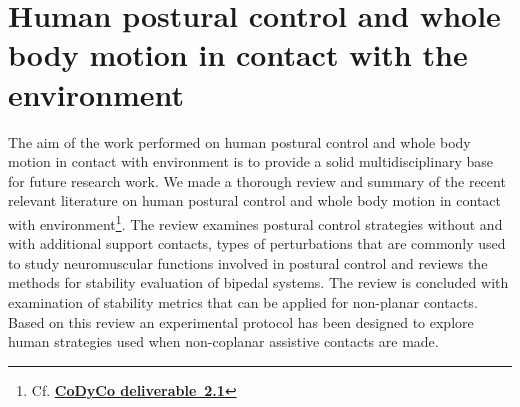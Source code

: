 \documentclass[final,5p,twocolumn]{elsarticle}
\begin{document}
\section{Human postural control and whole body motion in contact with the environment}
The aim of the work performed on human postural control and whole body motion in contact with environment is to provide a solid multidisciplinary base for future research work. We made a thorough review and summary of the recent relevant literature on human postural control and whole body motion in contact with environment\footnote{Cf. \href{https://github.com/robotology-playground/codyco-deliverables/blob/master/D2.1/pdf/D2.1.pdf?raw=true}{\textbf{CoDyCo deliverable~2.1}}}. The review examines postural control strategies without and with additional support contacts, types of perturbations that are commonly used to study neuromuscular functions involved in postural control and reviews the methods for stability evaluation of bipedal systems. The review is concluded with examination of stability metrics that can be applied for non-planar contacts. Based on this review an experimental protocol has been designed to explore human strategies used when non-coplanar assistive contacts are made.


\end{document}
